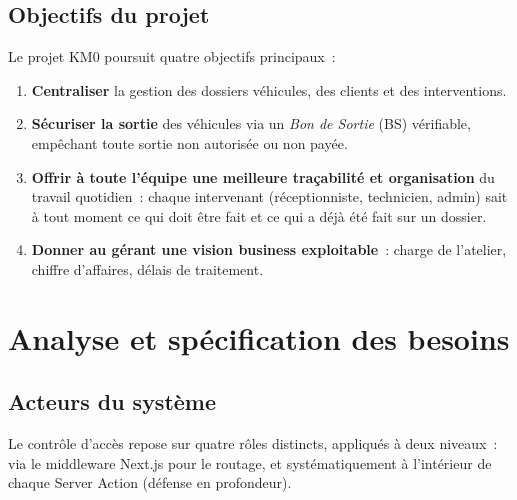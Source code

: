 \documentclass[11pt,a4paper]{report}
\begin{document}
\section{Objectifs du projet}

Le projet KM0 poursuit quatre objectifs principaux~:

\begin{enumerate}[label=\arabic*., leftmargin=1.2cm]
\item \textbf{Centraliser} la gestion des dossiers véhicules, des clients et des interventions.
\item \textbf{Sécuriser la sortie} des véhicules via un \emph{Bon de Sortie} (BS) vérifiable,
      empêchant toute sortie non autorisée ou non payée.
\item \textbf{Offrir à toute l'équipe une meilleure traçabilité et organisation} du travail
      quotidien~: chaque intervenant (réceptionniste, technicien, admin) sait à tout moment
      ce qui doit être fait et ce qui a déjà été fait sur un dossier.
\item \textbf{Donner au gérant une vision business exploitable}~: charge de l'atelier,
      chiffre d'affaires, délais de traitement.
\end{enumerate}

\chapter{Analyse et spécification des besoins}

\section{Acteurs du système}

Le contrôle d'accès repose sur quatre rôles distincts, appliqués à deux niveaux~: via le
middleware Next.js pour le routage, et systématiquement à l'intérieur de chaque Server
Action (défense en profondeur).
\end{document}
